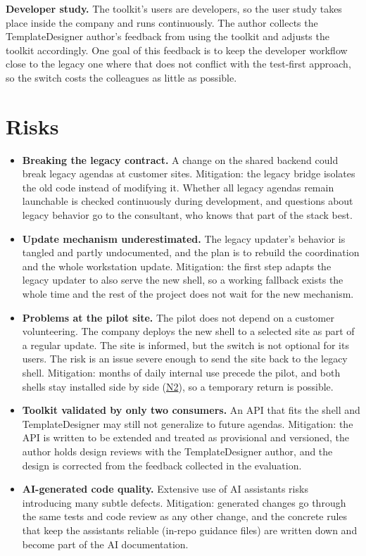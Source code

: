\documentclass{article}
\newcommand{\req}[1]{\hyperlink{req:#1}{#1}}
\begin{document}
\medskip
\noindent \textbf{Developer study.} The toolkit's users are developers, so the user study takes place inside the company and runs continuously. The author collects the TemplateDesigner author's feedback from using the toolkit and adjusts the toolkit accordingly. One goal of this feedback is to keep the developer workflow close to the legacy one where that does not conflict with the test-first approach, so the switch costs the colleagues as little as possible.

\section{Risks}
\label{sec:risks}

\begin{itemize}
  \item \textbf{Breaking the legacy contract.} A change on the shared backend could break legacy agendas at customer sites. Mitigation: the legacy bridge isolates the old code instead of modifying it. Whether all legacy agendas remain launchable is checked continuously during development, and questions about legacy behavior go to the consultant, who knows that part of the stack best.
  \item \textbf{Update mechanism underestimated.} The legacy updater's behavior is tangled and partly undocumented, and the plan is to rebuild the coordination and the whole workstation update. Mitigation: the first step adapts the legacy updater to also serve the new shell, so a working fallback exists the whole time and the rest of the project does not wait for the new mechanism.
  \item \textbf{Problems at the pilot site.} The pilot does not depend on a customer volunteering. The company deploys the new shell to a selected site as part of a regular update. The site is informed, but the switch is not optional for its users. The risk is an issue severe enough to send the site back to the legacy shell. Mitigation: months of daily internal use precede the pilot, and both shells stay installed side by side (\req{N2}), so a temporary return is possible.
  \item \textbf{Toolkit validated by only two consumers.} An API that fits the shell and TemplateDesigner may still not generalize to future agendas. Mitigation: the API is written to be extended and treated as provisional and versioned, the author holds design reviews with the TemplateDesigner author, and the design is corrected from the feedback collected in the evaluation.
  \item \textbf{AI-generated code quality.} Extensive use of AI assistants risks introducing many subtle defects. Mitigation: generated changes go through the same tests and code review as any other change, and the concrete rules that keep the assistants reliable (in-repo guidance files) are written down and become part of the AI documentation.

\end{itemize}
\end{document}
